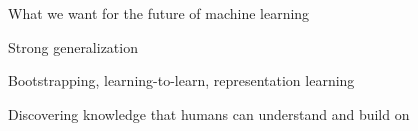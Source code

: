 \documentclass{beamer}
\newcommand{\closex}[2]{
  \renewcommand{\arraystretch}{#1}
  #2
  \renewcommand{\arraystretch}{1}
}
\newcommand{\closey}[2]{
  \setlength{\tabcolsep}{#1}
  #2
  \setlength{\tabcolsep}{6pt}
}
\newcommand\Wider[2][3em]{%
\makebox[\linewidth][c]{%
  \begin{minipage}{\dimexpr\textwidth+#1\relax}
  \raggedright#2
  \end{minipage}%
  }%
}
\begin{document}
\begin{frame}{What we want for the future of machine learning}

  Strong generalization %



  \vspace{1cm}

\pause  Bootstrapping, learning-to-learn, representation learning

  \vspace{1cm}

\pause  Discovering knowledge that humans can understand and build on

\end{frame}

\end{document}
